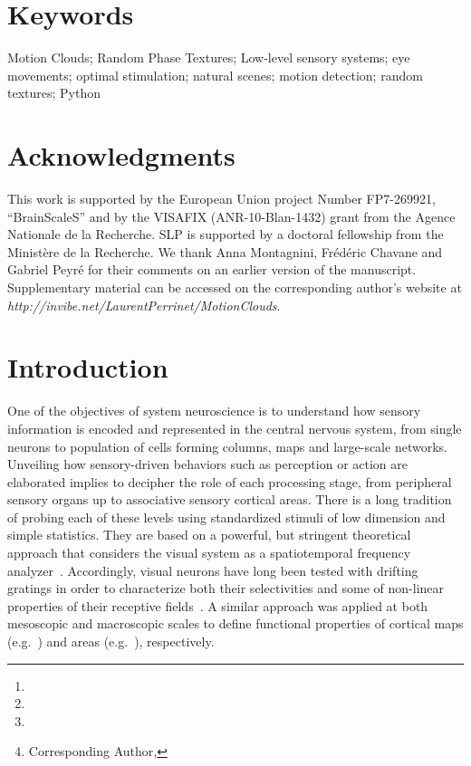 \documentclass[a4paper,11pt]{article}%
\title{\Title}%
\author[1,2]{\AuthorA \thanks{\EmailA}}
\author[1,2]{\AuthorB \thanks{\EmailB}}
\author[1,2]{\AuthorC \thanks{\EmailC}}
\author[1,2]{\AuthorD \thanks{Corresponding Author, \EmailD}}%
\affil[1]{\AddressA}
\affil[2]{\AddressB}
\date{}%
\newcommand{\Website}{http://invibe.net/LaurentPerrinet}%
\newcommand{\Abstract}{%
Choosing an appropriate set of stimuli is essential in order to characterize the response of a sensory system to a particular functional dimension, such as the eye movement following the motion of a visual scene. %
Here, we describe a framework to generate random texture movies with controlled information content, i.e., Motion Clouds. These stimuli are defined using a generative model which is based on controlled experimental parametrization. %
We show that Motion Clouds correspond to dense mixing of localized moving gratings with random positions. Their global envelope is similar to natural-like stimulation with an approximate full-field translation corresponding to a retinal slip. %
We describe the construction of these stimuli mathematically and propose an open-source python-based implementation. %
Examples of the use of this framework are shown. We also propose extensions to other modalities such as color vision, touch and audition.%
}%
\newcommand{\Keywords}%
{Motion Clouds; Random Phase Textures; Low-level sensory systems; eye movements; optimal stimulation; natural scenes; motion detection; random textures; Python}
\newcommand{\Acknowledgments}{%
This work is supported by the European Union project Number FP7-269921, ``BrainScaleS'' and by the VISAFIX (ANR-10-Blan-1432)  grant from the Agence Nationale de la Recherche. SLP is supported by a doctoral fellowship from the Minist{\`e}re de la Recherche. We thank Anna Montagnini, Fr\'ed\'eric Chavane and Gabriel Peyr\'e for their comments on an earlier version of the manuscript. Supplementary material can be accessed on the corresponding author's website at \textit{\Website/MotionClouds}.}%
\begin{document}
\maketitle
\begin{abstract}
\Abstract
\end{abstract}%
\section*{Keywords}
\Keywords
\section*{Acknowledgments}
\Acknowledgments
\section{Introduction }\label{intro}

One of the objectives of system neuroscience is to understand how sensory information is encoded and represented in the central nervous system, from single neurons to population of cells forming columns, maps and large-scale networks. Unveiling how sensory-driven behaviors such as perception or action are elaborated implies to decipher the role of each processing stage, from peripheral sensory organs up to associative sensory cortical areas. There is a long tradition of probing each of these levels using standardized stimuli of low dimension and simple statistics. They are based on a powerful, but stringent theoretical approach that considers the visual system as a spatiotemporal frequency analyzer~\citep{Graham79,Watson83}. Accordingly, visual neurons have long been tested with drifting gratings in order to characterize both their selectivities and some of non-linear properties of their receptive fields~\citep{DeValois1988Spatial}. A similar approach was applied at both mesoscopic and macroscopic scales to define functional properties of cortical maps (e.g.~\citep{Blasdel86,TsO90}) and areas (e.g.~\citep{Singh2000Spatiotemporal,Henriksson08}), respectively.  
\end{document}
